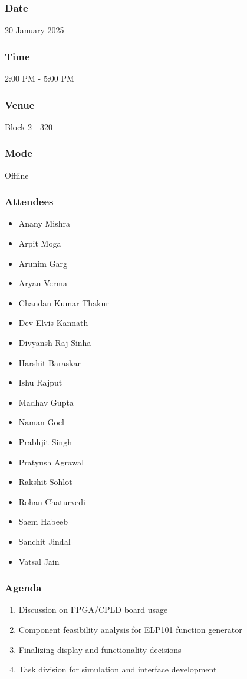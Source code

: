 \documentclass[12pt,a4paper]{article}
\begin{document}
\subsubsection*{Date}
20 January 2025

\subsubsection*{Time}
2:00 PM - 5:00 PM

\subsubsection*{Venue}
Block 2 - 320

\subsubsection*{Mode}
Offline

\subsubsection*{Attendees}
\begin{itemize}
    \item Anany Mishra
    \item Arpit Moga
    \item Arunim Garg
    \item Aryan Verma
    \item Chandan Kumar Thakur
    \item Dev Elvis Kannath
    \item Divyansh Raj Sinha
    \item Harshit Baraskar
    \item Ishu Rajput
    \item Madhav Gupta
    \item Naman Goel
    \item Prabhjit Singh
    \item Pratyush Agrawal
    \item Rakshit Sohlot
    \item Rohan Chaturvedi
    \item Saem Habeeb
    \item Sanchit Jindal
    \item Vatsal Jain
\end{itemize}

\subsubsection*{Agenda}
\begin{enumerate}
    \item Discussion on FPGA/CPLD board usage
    \item Component feasibility analysis for ELP101 function generator
    \item Finalizing display and functionality decisions
    \item Task division for simulation and interface development
\end{enumerate}
\end{document}
